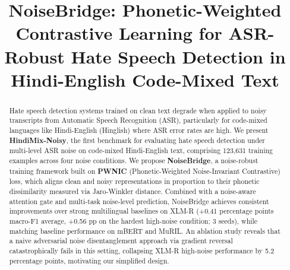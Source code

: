 \documentclass[conference]{IEEEtran}
\begin{document}
\title{NoiseBridge: Phonetic-Weighted Contrastive Learning for ASR-Robust Hate Speech Detection in Hindi-English Code-Mixed Text}

\author{
\and
{}
}

\maketitle

\begin{abstract}
Hate speech detection systems trained on clean text degrade when applied to noisy transcripts from Automatic Speech Recognition (ASR), particularly for code-mixed languages like Hindi-English (Hinglish) where ASR error rates are high. We present \textbf{HindiMix-Noisy}, the first benchmark for evaluating hate speech detection under multi-level ASR noise on code-mixed Hindi-English text, comprising 123,631 training examples across four noise conditions. We propose \textbf{NoiseBridge}, a noise-robust training framework built on \textbf{PWNIC} (Phonetic-Weighted Noise-Invariant Contrastive) loss, which aligns clean and noisy representations in proportion to their phonetic dissimilarity measured via Jaro-Winkler distance. Combined with a noise-aware attention gate and multi-task noise-level prediction, NoiseBridge achieves consistent improvements over strong multilingual baselines on XLM-R (+0.41 percentage points macro-F1 average, +0.56 pp on the hardest high-noise condition; 3 seeds), while matching baseline performance on mBERT and MuRIL. An ablation study reveals that a naive adversarial noise disentanglement approach via gradient reversal catastrophically fails in this setting, collapsing XLM-R high-noise performance by 5.2 percentage points, motivating our simplified design.
\end{abstract}
\end{document}
